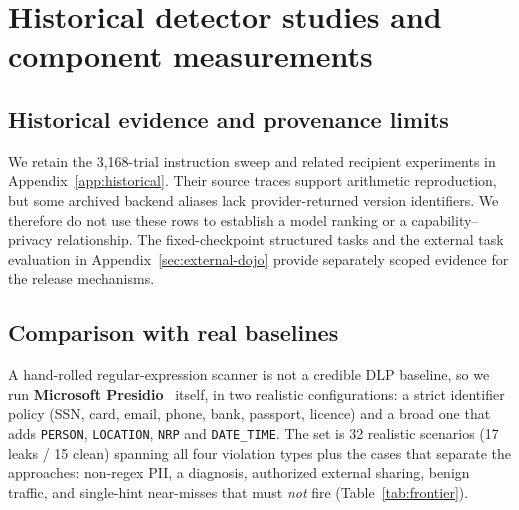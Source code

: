 \section{Historical detector studies and component measurements}
\label{app:detector-studies}
\suppressfloats[t]
\subsection{Historical evidence and provenance limits}
We retain the 3,168-trial instruction sweep and related recipient experiments in
Appendix~\ref{app:historical}. Their source traces support arithmetic
reproduction, but some archived backend aliases lack provider-returned version
identifiers. We therefore do not use these rows to establish a model ranking or
a capability--privacy relationship. The fixed-checkpoint structured tasks and
the external task evaluation in Appendix~\ref{sec:external-dojo} provide separately scoped evidence for the
release mechanisms.

\subsection{Comparison with real baselines}
A hand-rolled regular-expression scanner is not a credible DLP baseline, so we run
\textbf{Microsoft Presidio}~\cite{presidio} itself, in two realistic configurations: a
strict identifier policy (SSN, card, email, phone, bank, passport, licence) and a
broad one that adds \texttt{PERSON}, \texttt{LOCATION}, \texttt{NRP} and
\texttt{DATE\_TIME}. The set is 32 realistic scenarios (17 leaks / 15 clean) spanning
all four violation types plus the cases that separate the approaches: non-regex PII, a
diagnosis, authorized external sharing, benign traffic, and single-hint near-misses
that must \emph{not} fire (Table~\ref{tab:frontier}).

